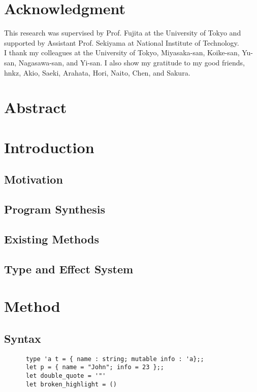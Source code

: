\maketitle
\newpage
\tableofcontents
\newpage

\chapter*{Acknowledgment}
This research was supervised by Prof. Fujita at the University of Tokyo and supported by Assistant Prof. Sekiyama at National Institute of Technology. \\
I thank my colleagues at the University of Tokyo, Miyasaka-san, Koike-san, Yu-san, Nagasawa-san, and Yi-san.
I also show my gratitude to my good friends, hnkz, Akio, Saeki, Arahata, Hori, Naito, Chen, and Sakura.

\chapter{Abstract} %
\cite{gulwani2017program}

\chapter{Introduction}
  \section{Motivation}
  \section{Program Synthesis}
  \section{Existing Methods}
  \section{Type and Effect System}

\chapter{Method} %
  \section{Syntax}
    \begin{verbatim}
      type 'a t = { name : string; mutable info : 'a};;
      let p = { name = "John"; info = 23 };;
      let double_quote = '"'
      let broken_highlight = ()
    \end{verbatim}
